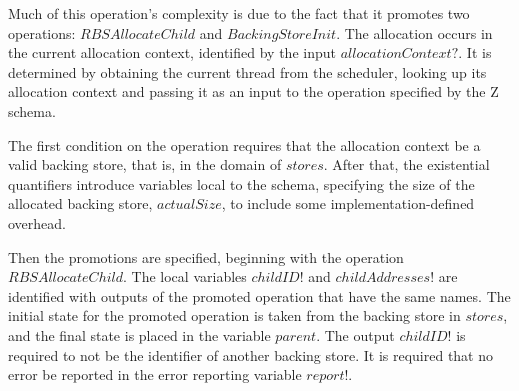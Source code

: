 \documentclass[a4paper,10pt]{report}
\begin{document}
Much of this operation's complexity is due to the fact that it promotes two
operations: $RBSAllocateChild$ and $BackingStoreInit$. The allocation occurs in
the current allocation context, identified by the input $allocationContext?$. It
is determined by obtaining the current thread from the scheduler, looking up its
allocation context and passing it as an input to the operation specified by the
Z schema.

The first condition on the operation requires that the allocation context be a
valid backing store, that is, in the domain of $stores$. After that, the
existential quantifiers introduce variables local to the schema, specifying the
size of the allocated backing store, $actualSize$, to include some
implementation-defined overhead.

Then the promotions are specified, beginning with the operation
$RBSAllocateChild$. The local variables $childID!$ and $childAddresses!$ are
identified with outputs of the promoted operation that have the same names. The
initial state for the promoted operation is taken from the backing store in
$stores$, and the final state is placed in the variable $parent$.  The output
$childID!$ is required to not be the identifier of another backing store. It is
required that no error be reported in the error reporting variable $report!$.
\end{document}
